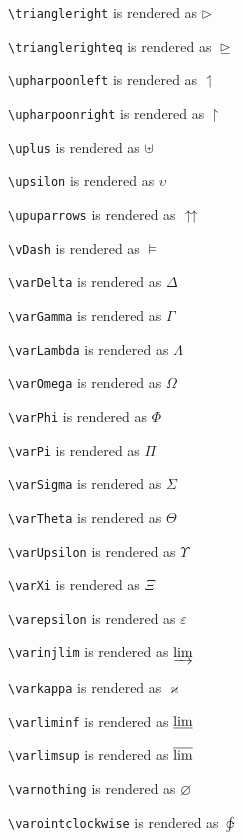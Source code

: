 \texttt{\textbackslash triangleright} is rendered as $\triangleright$

\texttt{\textbackslash trianglerighteq} is rendered as $\trianglerighteq$



\texttt{\textbackslash upharpoonleft} is rendered as $\upharpoonleft$

\texttt{\textbackslash upharpoonright} is rendered as $\upharpoonright$

\texttt{\textbackslash uplus} is rendered as $\uplus$

\texttt{\textbackslash upsilon} is rendered as $\upsilon$

\texttt{\textbackslash upuparrows} is rendered as $\upuparrows$

\texttt{\textbackslash vDash} is rendered as $\vDash$

\texttt{\textbackslash varDelta} is rendered as $\varDelta$

\texttt{\textbackslash varGamma} is rendered as $\varGamma$

\texttt{\textbackslash varLambda} is rendered as $\varLambda$

\texttt{\textbackslash varOmega} is rendered as $\varOmega$

\texttt{\textbackslash varPhi} is rendered as $\varPhi$

\texttt{\textbackslash varPi} is rendered as $\varPi$

\texttt{\textbackslash varSigma} is rendered as $\varSigma$

\texttt{\textbackslash varTheta} is rendered as $\varTheta$

\texttt{\textbackslash varUpsilon} is rendered as $\varUpsilon$

\texttt{\textbackslash varXi} is rendered as $\varXi$

\texttt{\textbackslash varepsilon} is rendered as $\varepsilon$

\texttt{\textbackslash varinjlim} is rendered as $\varinjlim$

\texttt{\textbackslash varkappa} is rendered as $\varkappa$

\texttt{\textbackslash varliminf} is rendered as $\varliminf$

\texttt{\textbackslash varlimsup} is rendered as $\varlimsup$

\texttt{\textbackslash varnothing} is rendered as $\varnothing$

\texttt{\textbackslash varointclockwise} is rendered as $\varointclockwise$


